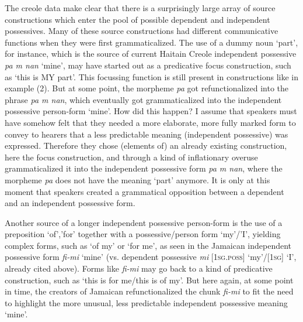\documentclass[output=paper]{langsci/langscibook}
\begin{document}
The creole data make clear that there is a surprisingly large array of source constructions which enter the pool of possible dependent and independent possessives. Many of these source constructions had different communicative functions when they were first grammaticalized. The use of a dummy noun `part', for instance, which is the source of current Haitain Creole independent possessive \textit{pa m nan} `mine', may have started out as a predicative focus construction, such as `this is MY part'. This focussing function is still present in constructions like in example (2). But at some point, the morpheme \textit{pa} got refunctionalized into the phrase \textit{pa m nan}, which eventually got grammaticalized into the independent possessive person-form `mine'. How did this happen? I assume that speakers must have somehow felt that they needed a more elaborate, more fully marked form to convey to hearers that a less predictable meaning (independent possessive) was expressed. Therefore they chose (elements of) an already existing construction, here the focus construction, and through a kind of inflationary overuse grammaticalized it into the independent possessive form \textit{pa m nan}, where the morpheme \textit{pa} does not have the meaning `part' anymore. It is only at this moment that speakers created a grammatical opposition between a dependent and an independent possessive form. 

Another source of a longer independent possessive person-form is the use of a preposition `of','for' together with a possessive/person form `my'/'I', yielding complex forms, such as `of my' or `for me', as seen in the Jamaican independent possessive form \textit{fi-mi} `mine' (vs. dependent possessive \textit{mi} [\textsc{1sg.poss]} `my'/[1\textsc{sg]} `I', already cited above). Forms like \textit{fi-mi} may go back to a kind of predicative construction, such as `this is for me/this is of my'. But here again, at some point in time, the creators of Jamaican refunctionalized the chunk \textit{fi-mi} to fit the need to highlight the more unusual, less predictable independent possessive meaning `mine'. 
\end{document}
